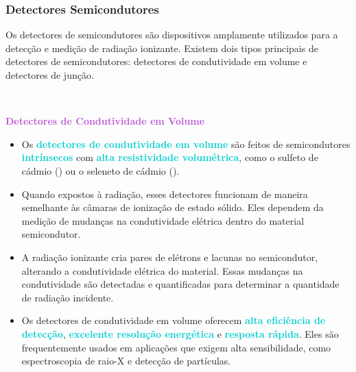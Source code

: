 \documentclass[11pt,a4paper]{article}
\begin{document}
\subsubsection*{Detectores Semicondutores}

	Os detectores de semicondutores são dispositivos amplamente utilizados para a detecção e medição de radiação ionizante. Existem dois tipos principais de detectores de semicondutores: detectores de condutividade em volume e detectores de junção.

	\

	\textcolor{MediumOrchid}{\Large\LobsterTwo\textbf{Detectores de Condutividade em Volume}}
	\begin{itemize}
		\item Os \textcolor{DarkTurquoise}{\textbf{detectores de condutividade em volume}} são feitos de semicondutores \textcolor{DarkTurquoise}{\textbf{intrínsecos}} com \textcolor{DarkTurquoise}{\textbf{alta resistividade volumétrica}}, como o sulfeto de cádmio () ou o seleneto de cádmio ().
		\item Quando expostos à radiação, esses detectores funcionam de maneira semelhante às câmaras de ionização de estado sólido. Eles dependem da medição de mudanças na condutividade elétrica dentro do material semicondutor.
		\item A radiação ionizante cria pares de elétrons e lacunas no semicondutor, alterando a condutividade elétrica do material. Essas mudanças na condutividade são detectadas e quantificadas para determinar a quantidade de radiação incidente.
		\item Os detectores de condutividade em volume oferecem \textcolor{DarkTurquoise}{\textbf{alta eficiência de detecção}}, \textcolor{DarkTurquoise}{\textbf{excelente resolução energética}} e \textcolor{DarkTurquoise}{\textbf{resposta rápida}}. Eles são frequentemente usados em aplicações que exigem alta sensibilidade, como espectroscopia de raio-X e detecção de partículas.
	\end{itemize}
\end{document}
